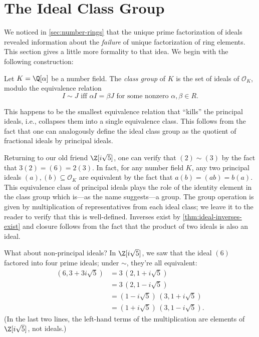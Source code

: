 \section{The Ideal Class Group}

We noticed in \autoref{sec:number-rings} that the unique prime factorization of ideals revealed information about the \emph{failure} of unique factorization of ring elements. This section gives a little more formality to that idea. We begin with the following construction:

\begin{definition}
    \label{def:ideal-class-group}
    Let $K = \Q[\alpha]$ be a number field. The \textit{class group} of $K$ is the set of ideals of $\mathcal O_K$, modulo the equivalence relation
    \begin{equation}
        I \sim J \text{ iff } \alpha I = \beta J \text{ for some nonzero } \alpha, \beta \in R.
    \end{equation}
\end{definition}

This happens to be the smallest equivalence relation that ``kills'' the principal ideals, i.e., collapses them into a single equivalence class.
This follows from the fact that one can analogously define the ideal class group as the quotient of fractional ideals by principal ideals.

Returning to our old friend $\Z[i \sqrt 5]$, one can verify that $(2) \sim (3)$ by the fact that $3 (2) = (6) = 2 (3)$.
In fact, for any number field $K$, any two principal ideals $(a), (b) \subseteq \mathcal O_K$ are equivalent by the fact that $a (b) = (ab) = b (a)$.
This equivalence class of principal ideals plays the role of the identity element in the class group which is---as the name suggests---a group. The group operation is given by multiplication of representatives from each ideal class; we leave it to the reader to verify that this is well-defined. Inverses exist by \autoref{thm:ideal-inverses-exist} and closure follows from the fact that the product of two ideals is also an ideal.

What about non-principal ideals? In $\Z[i \sqrt 5]$, we saw that the ideal $(6)$ factored into four prime ideals; under $\sim$, they're all equivalent:
\begin{equation}
    \begin{aligned}
        (6, 3 + 3 i \sqrt 5)
         & = 3 \, (2, 1 + i \sqrt 5)                \\
         & = 3 \, (2, 1 - i \sqrt 5)                \\
         & = (1 - i \sqrt 5) \, (3, 1 + i \sqrt 5)  \\
         & = (1 + i \sqrt 5) \, (3, 1 - i \sqrt 5).
    \end{aligned}
\end{equation}
(In the last two lines, the left-hand terms of the multiplication are elements of $\Z[i \sqrt 5]$, not ideals.)

